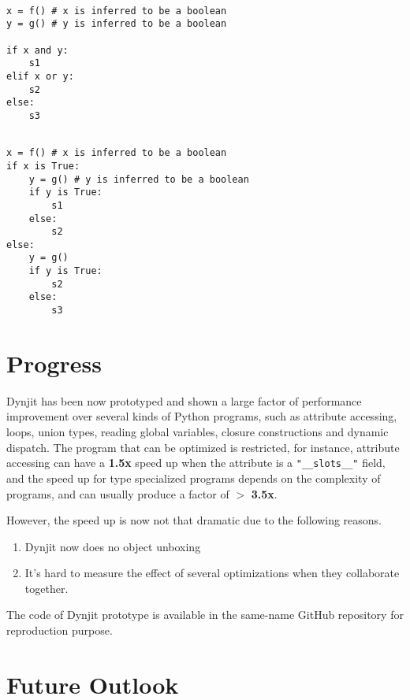 \documentclass[conference]{IEEEtran}
\begin{document}
\lstset{language=Python, showlines=true, mathescape=true}
\begin{lstlisting}[caption=Boolean Split: Original Python Code]

x = f() # x is inferred to be a boolean
y = g() # y is inferred to be a boolean

if x and y:
    s1
elif x or y:
    s2
else:
    s3
\end{lstlisting}


\lstset{language=Python, showlines=true, mathescape=true}
\begin{lstlisting}[caption=Boolean Split: Boolean-split Python Code]

x = f() # x is inferred to be a boolean
if x is True:
    y = g() # y is inferred to be a boolean
    if y is True:
        s1
    else:
        s2
else:
    y = g()
    if y is True:
        s2
    else:
        s3
\end{lstlisting}


\section*{Progress}

Dynjit has been now prototyped and shown a large factor of performance improvement over several kinds of Python programs, such as attribute accessing,
loops, union types, reading global variables, closure constructions and dynamic dispatch. The program that can be optimized is restricted,
for instance, attribute accessing can have a \textbf{1.5x} speed up when the attribute is a \lstinline!"__slots__"! field,
and the speed up for type specialized programs depends on the complexity of programs, and can usually produce a factor
of $>$ \textbf{3.5x}.

However, the speed up is now not that dramatic due to the following reasons.

\begin{enumerate}
    \item Dynjit now does no object unboxing
    \item It's hard to measure the effect of several optimizations when they collaborate together.
\end{enumerate}

The code of Dynjit prototype is available in the same-name GitHub repository for reproduction purpose.


\section*{Future Outlook}
\end{document}
